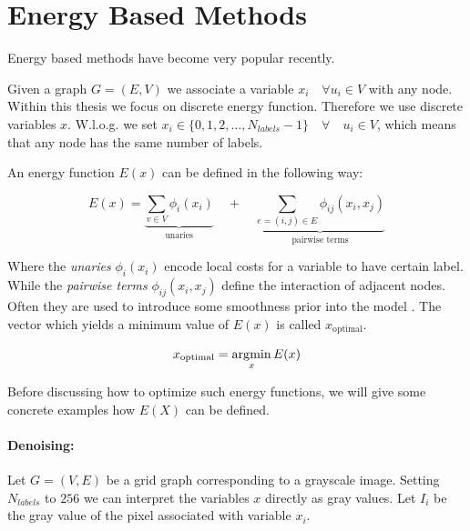 \section{Energy Based Methods}\label{sec:energy_based_methods}

Energy based methods have become very popular recently.

Given a graph $G = (E,V)$ we 
associate  a variable $ x_i \quad \forall  u_i \in V$ with any node.
Within this thesis we focus on discrete energy function.
Therefore we use discrete variables $x$.
W.l.o.g. we set  $ x_i   \in \{ 0,1,2,\ldots, N_{labels}-1 \} \quad \forall \quad u_i \in V$,
which means that any node has the same number of labels.

An energy function $E(x)$ can be  defined  in the following way:

\begin{equation} \label{eq:gm_energy}
    E(x) = 
    \underbrace{
        \sum_{v \in V} \phi_i(x_i)
    }_{\text{unaries}}
     \quad +  \quad
    \underbrace{
        \sum_{e=(i,j) \in E } \phi_{ij}(x_i,x_j) 
    }_{\text{pairwise terms}}
\end{equation}



Where the \emph{unaries} $\phi_i(x_i)$ encode local costs
for a variable to have certain label.
While the \emph{pairwise terms} $\phi_{ij}(x_i,x_j) $ define the interaction of adjacent nodes.
Often they are used to introduce some smoothness prior
into the model \citep{szeliski_2008_pami}.
The vector which yields a minimum value of $E(x)$
is called $x_{\text{optimal}}$.

\begin{equation} \label{eq:gm_argmin}
x_{\text{optimal}} = \operatorname*{\arg\!\min}_{x}  E(x)
\end{equation}


Before discussing how to optimize such energy functions,
we will give some concrete examples how $E(X)$ 
can be defined.



\paragraph{Denoising:}


Let $G=(V,E)$ be a grid graph corresponding to
a grayscale image.
Setting $N_{labels}$ to $256$ we can interpret  the variables $x$ directly as
gray values.
Let $I_i$ be the gray value of the pixel associated with variable $x_i$.

